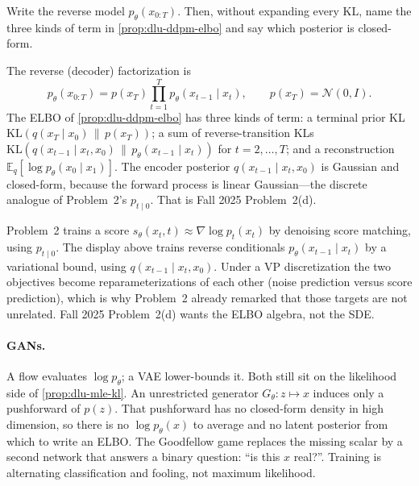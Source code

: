 \begin{exercise}
\label{ex:dlu-ddpm}
Write the reverse model \(p_\theta(x_{0:T})\). Then, without expanding every KL, name the three kinds of term in \cref{prop:dlu-ddpm-elbo} and say which posterior is closed-form.
\end{exercise}

\begin{solution}
The reverse (decoder) factorization is
\[
p_\theta(x_{0:T})
=
p(x_T)\prod_{t=1}^T p_\theta(x_{t-1}\mid x_t),
\qquad
p(x_T)=\mathcal{N}(0,I).
\]
The ELBO of \cref{prop:dlu-ddpm-elbo} has three kinds of term: a terminal prior KL \(\mathrm{KL}(q(x_T\mid x_0)\,\|\,p(x_T))\); a sum of reverse-transition KLs \(\mathrm{KL}(q(x_{t-1}\mid x_t,x_0)\,\|\,p_\theta(x_{t-1}\mid x_t))\) for \(t=2,\dots,T\); and a reconstruction \(\mathbb{E}_q[\log p_\theta(x_0\mid x_1)]\). The encoder posterior \(q(x_{t-1}\mid x_t,x_0)\) is Gaussian and closed-form, because the forward process is linear Gaussian---the discrete analogue of Problem~2's \(p_{t\mid 0}\). That is Fall 2025 Problem~2(d).
\end{solution}

\begin{remark}
\label{rem:dlu-two-diffusions}
Problem~2 trains a score \(s_\theta(x_t,t)\approx\nabla\log p_t(x_t)\) by denoising score matching, using \(p_{t\mid 0}\). The display above trains reverse conditionals \(p_\theta(x_{t-1}\mid x_t)\) by a variational bound, using \(q(x_{t-1}\mid x_t,x_0)\). Under a VP discretization the two objectives become reparameterizations of each other (noise prediction versus score prediction), which is why Problem~2 already remarked that those targets are not unrelated. Fall 2025 Problem~2(d) wants the ELBO algebra, not the SDE.
\end{remark}

\paragraph{GANs.}

A flow evaluates \(\log p_\theta\); a VAE lower-bounds it. Both still sit on the likelihood side of \cref{prop:dlu-mle-kl}. An unrestricted generator \(G_\theta:z\mapsto x\) induces only a pushforward of \(p(z)\). That pushforward has no closed-form density in high dimension, so there is no \(\log p_\theta(x)\) to average and no latent posterior from which to write an ELBO. The Goodfellow game replaces the missing scalar by a second network that answers a binary question: ``is this \(x\) real?''. Training is alternating classification and fooling, not maximum likelihood.

